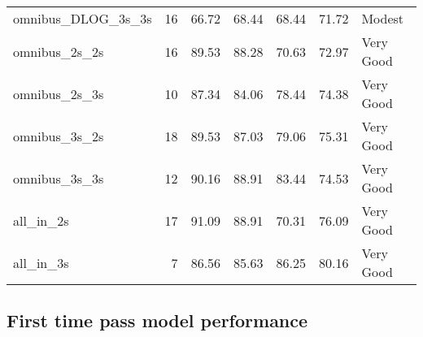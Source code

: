 \documentclass[a4paper,]{book}
\begin{document}
\begin{table}
\begin{tabular}[t]{lrrrrrl}
omnibus\_DLOG\_3s\_3s & 16 & 66.72 & 68.44 & 68.44 & 71.72 & Modest\\
omnibus\_2s\_2s & 16 & 89.53 & 88.28 & 70.63 & 72.97 & Very Good\\
omnibus\_2s\_3s & 10 & 87.34 & 84.06 & 78.44 & 74.38 & Very Good\\
omnibus\_3s\_2s & 18 & 89.53 & 87.03 & 79.06 & 75.31 & Very Good\\
\addlinespace
omnibus\_3s\_3s & 12 & 90.16 & 88.91 & 83.44 & 74.53 & Very Good\\
all\_in\_2s & 17 & 91.09 & 88.91 & 70.31 & 76.09 & Very Good\\
all\_in\_3s & 7 & 86.56 & 85.63 & 86.25 & 80.16 & Very Good\\
\bottomrule
\end{tabular}
\end{table}

\hypertarget{first-time-pass-model-performance}{%
\subsection{First time pass model performance}\label{first-time-pass-model-performance}}
\end{document}
